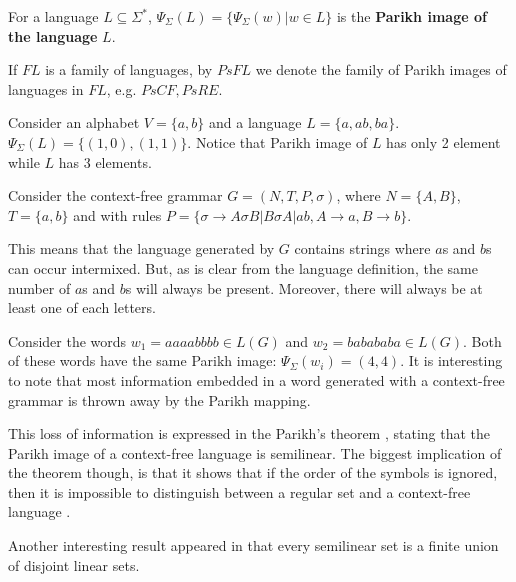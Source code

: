 \begin{definition}
For a language $L\subseteq \Sigma^*$, $\Psi_\Sigma(L)=\{\Psi_\Sigma(w)|w\in L\}$ is the {\bf Parikh image of the language} $L$.
\end{definition}

\begin{definition}
If $FL$ is a family of languages, by $PsFL$ we denote the family of Parikh images of languages in $FL$, e.g. $PsCF, PsRE$.
\end{definition}

\begin{example}
Consider an alphabet $V=\{a,b\}$ and a language $L=\{a, ab, ba\}$.
$\Psi_\Sigma(L)=\{(1,0), (1,1)\}$. Notice that Parikh image of $L$ has only 2 element while $L$ has 3 elements.
\end{example}

\begin{example}
  Consider the context-free grammar $G = (N,T,P,\sigma)$, where $N=\{A,B\}$, $T=\{a,b\}$ and with rules $P=\{\sigma\rightarrow A\sigma B|B\sigma A|ab, A\rightarrow a, B\rightarrow b\}$.

  This means that the language generated by $G$ contains strings where $a$s and $b$s can occur intermixed. But, as is clear from the language definition, the same number of $a$s and $b$s will always be present. Moreover, there will always be at least one of each letters.

  Consider the words $w_1 = aaaabbbb \in L(G)$ and $w_2 = babababa \in L(G)$. Both of these words have the same Parikh image: $\Psi_\Sigma(w_i) = (4,4)$. It is interesting to note that most information embedded in a word generated with a context-free grammar is thrown away by the Parikh mapping.
\end{example}

This loss of information is expressed in the  Parikh's theorem \cite{Parikh66}, stating that the Parikh image of a context-free language is semilinear. The biggest implication of the theorem though, is that it shows that if the order of the symbols is ignored, then it is impossible to distinguish between a regular set and a context-free language \cite{Kozen97Automata}.

Another interesting result appeared in \cite{Ito69Semilinear} that every semilinear set is a finite union of disjoint linear sets.

